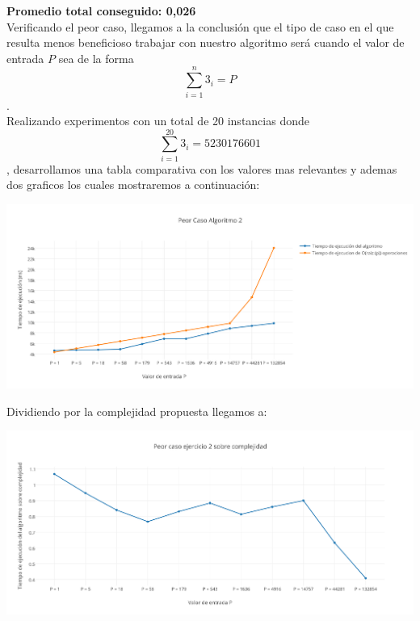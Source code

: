     \textbf{Promedio total conseguido: 0,026}  \\

Verificando el peor caso, llegamos a la conclusi\'on que el tipo de caso en el que resulta menos beneficioso trabajar con nuestro algoritmo ser\'a cuando el valor de entrada $P$ sea de la forma \[
\sum_{i=1}^{n}3_{i}=P 
\].
\\

Realizando experimentos con un total de 20 instancias donde \[
\sum_{i=1}^{20}3_{i}=5230176601 
\], desarrollamos una tabla comparativa con los valores mas relevantes y ademas dos graficos los cuales mostraremos a continuaci\'on: \\

\vspace*{0.3cm} \vspace*{0.3cm}
  \begin{center}
 \includegraphics[scale=0.6]{./EJ2/peorcaso.png}
  \end{center}
  \vspace*{0.3cm}


Dividiendo por la complejidad propuesta llegamos a:\\

\vspace*{0.3cm} \vspace*{0.3cm}
  \begin{center}
 \includegraphics[scale=0.6]{./EJ2/peorcaso2.png}
  \end{center}
  \vspace*{0.3cm}

